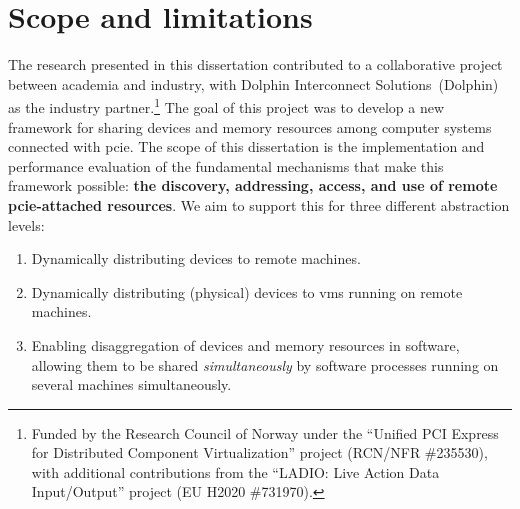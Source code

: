 \section{Scope and limitations}\label{sec:scope}
The research presented in this dissertation contributed to a collaborative project between academia and industry, with Dolphin Interconnect Solutions~(Dolphin) as the industry partner.\footnote{Funded by the Research Council of Norway under the ``Unified PCI Express for Distributed Component Virtualization'' project (RCN/NFR \#235530), with additional contributions from the ``LADIO: Live Action Data Input/Output'' project (EU H2020 \#731970).}
%
The goal of this project was to develop a new framework for sharing devices and memory resources among computer systems connected with \gls{pcie}.
%
The scope of this dissertation is the implementation and performance evaluation of the fundamental mechanisms that make this framework possible: \textbf{the discovery, addressing, access, and use of remote \gls{pcie}-attached resources}.
%
We aim to support this for three different abstraction levels:
\begin{enumerate}
    \item Dynamically distributing devices to remote machines.
    \item Dynamically distributing (physical) devices to \glspl{vm} running on remote machines.
    \item Enabling \gls{disaggregation} of devices and memory resources in software, allowing them to be shared \emph{simultaneously} by software processes running on several machines simultaneously.
\end{enumerate}



